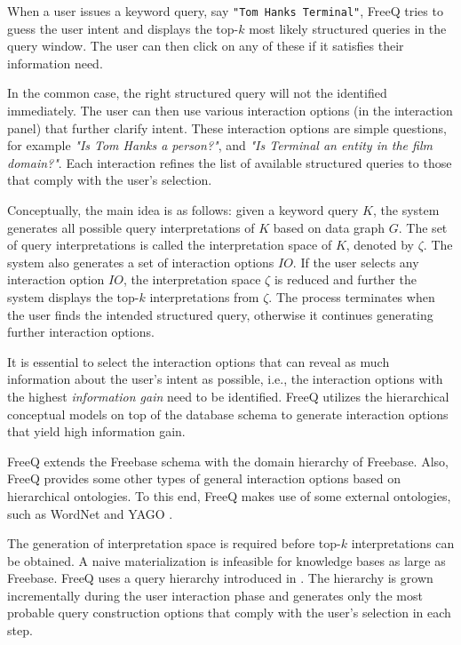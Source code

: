 \documentclass[a4paper, twoside, 12pt]{report}
\begin{document}
 When a user issues a keyword query, say \texttt{"Tom Hanks Terminal"}, FreeQ tries to guess the user intent and displays the top-$k$ most likely structured queries in the query window. The user can then click on any of these if it satisfies their information need. 
 
 In the common case, the right structured query will not the identified immediately. The user can then use various interaction options (in the interaction panel) that further clarify intent. These interaction options are simple questions, for example \emph{"Is Tom Hanks a person?"}, and \emph{"Is Terminal an entity in the film domain?"}. Each interaction refines the list of available structured queries to those that comply with the user's selection. 
 
 Conceptually, the main idea is as follows: given a keyword query $K$, the system generates all possible query interpretations of $K$ based on data graph $G$. The set of query interpretations is called the interpretation space of $K$, denoted by $\zeta$. The system also generates a set of interaction options $IO$. If the user selects any interaction option $IO$, the interpretation space $\zeta$ is reduced and further the system displays the top-$k$ interpretations from $\zeta$. The process terminates when the user finds the intended structured query, otherwise it continues generating further interaction options.
 
 It is essential to select the interaction options that can reveal as much information about the user’s intent as possible, i.e., the interaction options with the highest \emph{information gain} need to be identified. FreeQ utilizes the hierarchical conceptual models on top of the database schema to generate interaction options that yield high information gain.
 
 FreeQ extends the Freebase schema with the domain hierarchy of Freebase. Also, FreeQ provides some other types of general interaction options based on hierarchical ontologies. To this end, FreeQ makes use of some external ontologies, such as WordNet \cite{miller1995wordnet} and YAGO \cite{suchanek2007yago}.
 
 The generation of interpretation space is required before top-$k$ interpretations can be obtained. A naive materialization is infeasible for knowledge bases as large as Freebase. FreeQ  uses a query hierarchy introduced in \cite{demidova2012probabilistic}. The hierarchy is grown incrementally during the user interaction phase and generates only the most probable query construction options that comply with the user's selection in each step.
 
\end{document}
